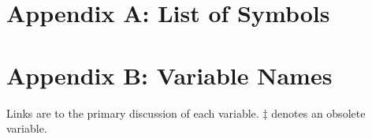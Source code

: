 \documentclass[
  english,
]{book}
\begin{document}
\hypertarget{appendix-a-list-of-symbols}{%
\chapter*{Appendix A: List of
Symbols}\label{appendix-a-list-of-symbols}}

\hypertarget{appendix-b-variable-names}{%
\chapter*{Appendix B: Variable Names}\label{appendix-b-variable-names}}

Links are to the primary discussion of each variable. \(\ddagger\)
denotes an obsolete variable.
\end{document}
